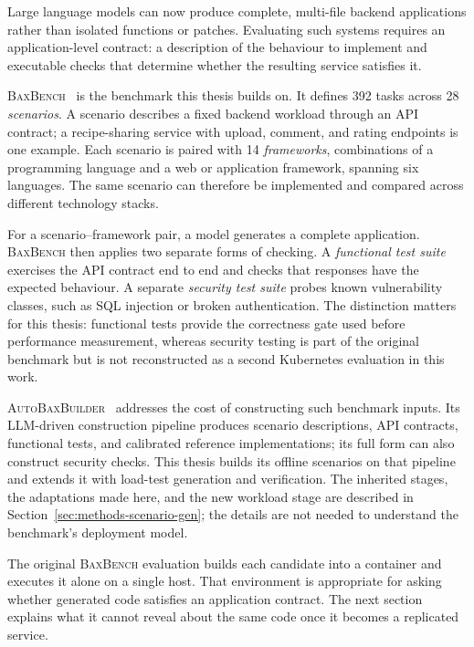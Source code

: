 Large language models can now produce complete, multi-file backend
applications rather than isolated functions or patches. Evaluating such
systems requires an application-level contract: a description of the
behaviour to implement and executable checks that determine whether the
resulting service satisfies it.

\textsc{BaxBench}~\cite{vero2025baxbench} is the benchmark this thesis builds
on. It defines 392 tasks across 28 \emph{scenarios}. A scenario describes a
fixed backend workload through an API contract; a recipe-sharing service with
upload, comment, and rating endpoints is one example. Each scenario is paired
with 14 \emph{frameworks}, combinations of a programming language and a web
or application framework, spanning six languages. The same scenario can
therefore be implemented and compared across different technology stacks.

For a scenario--framework pair, a model generates a complete application.
\textsc{BaxBench} then applies two separate forms of checking. A
\emph{functional test suite} exercises the API contract end to end and checks
that responses have the expected behaviour. A separate \emph{security test
suite} probes known vulnerability classes, such as SQL injection or broken
authentication. The distinction matters for this thesis: functional tests
provide the correctness gate used before performance measurement, whereas
security testing is part of the original benchmark but is not reconstructed
as a second Kubernetes evaluation in this work.

\textsc{AutoBaxBuilder}~\cite{vonarx2025autobaxbuilder} addresses the cost of
constructing such benchmark inputs. Its LLM-driven construction pipeline
produces scenario descriptions, API contracts, functional tests, and
calibrated reference implementations; its full form can also construct
security checks. This thesis builds its offline scenarios on that pipeline and
extends it with load-test generation and verification. The inherited stages,
the adaptations made here, and the new workload stage are described in
Section~\ref{sec:methods-scenario-gen}; the details are not needed to
understand the benchmark's deployment model.

The original \textsc{BaxBench} evaluation builds each candidate into a
container and executes it alone on a single host. That environment is
appropriate for asking whether generated code satisfies an application
contract. The next section explains what it cannot reveal about the same code
once it becomes a replicated service.


